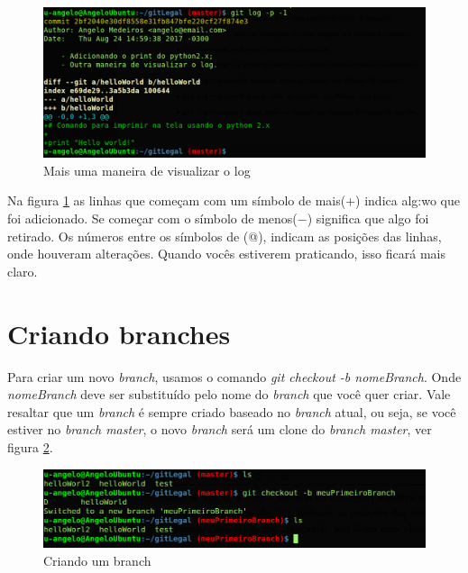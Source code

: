 \documentclass[12pt,openright,oneside,a4paper,english,brazil]{abntex2}
\begin{document}
\begin{figure}[H]
	\caption{\label{logp}Mais uma maneira de visualizar o log}
	\begin{center}
		\includegraphics[width=1\linewidth]{logp}
	\end{center}
\end{figure}

Na figura \ref{logp} as linhas que começam com um símbolo de mais(+) indica alg:wo que foi adicionado. Se começar com o símbolo de menos($-$) significa que algo foi retirado. Os números entre os símbolos de (@), indicam as posições das linhas, onde houveram alterações. Quando vocês estiverem praticando, isso ficará mais claro.

\section{Criando branches \label{criandobranch}}

Para criar um novo \textit{branch}, usamos o comando \textit{git checkout -b nomeBranch}. Onde \textit{nomeBranch} deve ser substituído pelo nome do \textit{branch} que você quer criar. Vale resaltar que um \textit{branch} é sempre criado baseado no \textit{branch} atual, ou seja, se você estiver no\textit{ branch master}, o novo \textit{branch} será um clone do \textit{branch master}, ver figura \ref{novobranch}.

\begin{figure}[H]
	\caption{\label{novobranch}Criando um branch}
	\begin{center}
		\includegraphics[width=1\linewidth]{novobranch}
	\end{center}
\end{figure}
\end{document}
